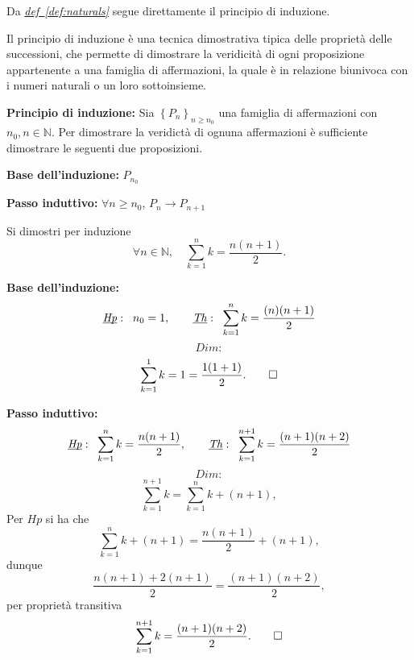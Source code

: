 Da \textit{\hyperref[def:naturals]{def~\ref*{def:naturals}}} segue direttamente il principio di induzione.

Il principio di induzione è una tecnica dimostrativa tipica delle proprietà delle successioni,
che permette di dimostrare la veridicità di ogni proposizione appartenente a una famiglia
di affermazioni, la quale è in relazione biunivoca con i numeri naturali o un loro sottoinsieme.

\vspace{0.5cm}

\textbf{Principio di induzione:} Sia $\left\{P_n\right\}_{n \geq n_0}$ una famiglia di affermazioni con
$n_0, n \in \mathbb{N}$. Per dimostrare la veridictà di ognuna affermazioni è sufficiente dimostrare le
seguenti due proposizioni.

\begin{list_1}
    \item \textbf{Base dell'induzione:} $P_{n_0}$
    \item \textbf{Passo induttivo:} $\forall n \geq n_0$, $P_n \rightarrow P_{n+1}$
\end{list_1}

\begin{example}
    Si dimostri per induzione 
    \[
        \forall n \in \mathbb{N}, \quad \sum_{k=1}^{n} k = \frac{n(n+1)}{2}.
    \]

    \begin{list_3}
        \item \textbf{Base dell'induzione:}
        \[
            \underbar{\textit{Hp}}: \;\; n_0=1, \qquad \underbar{\textit{Th}}: \;\; \sum_{k=1}^{n} k = \frac{(n)(n+1)}{2}
        \]
        \vspace{0.2cm}
        \[
            Dim:
        \]
        \[
            \sum_{k=1}^{1} k = 1 = \frac{1(1+1)}{2}. \qed
        \]
        \item \textbf{Passo induttivo:}
            \[
                \underbar{\textit{Hp}}: \;\; \sum_{k=1}^{n} k = \frac{n(n+1)}{2}, \qquad \underbar{\textit{Th}}: \;\; \sum_{k=1}^{n+1} k = \frac{(n+1)(n+2)}{2}
            \]
            \[
                Dim:
            \]
            \[
                \sum_{k=1}^{n+1} k =
                \sum_{k=1}^{n} k + (n+1),
            \]
            Per $Hp$ si ha che
            \[
                \sum_{k=1}^{n} k + (n+1) =
                \frac{n(n+1)}{2} + (n+1),
            \]
            dunque
            \[
                \frac{n(n+1) + 2(n+1)}{2} =
                \frac{(n+1)(n+2)}{2},
            \]
            per proprietà transitiva
            \[
                \sum_{k=1}^{n+1} k =
                \frac{(n+1)(n+2)}{2}. \qed
            \]
    \end{list_3}

\end{example}

\vspace{0.7cm}